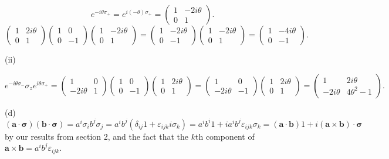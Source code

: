 \documentclass[11pt, letterpaper]{article}
\begin{document}
\[
	e^{-i\theta \sigma _+} =e^{i(-\theta )\sigma _+} =\begin{pmatrix}
	1 & -2i\theta  \\
	0 & 1
	\end{pmatrix}
.\]
\[
	\begin{pmatrix}
	1 & 2i\theta  \\
	0 & 1
	\end{pmatrix}\begin{pmatrix}
	1 & 0 \\
	0 & -1
	\end{pmatrix}\begin{pmatrix}
	1 & -2i\theta  \\
	0 & 1
	\end{pmatrix}=\begin{pmatrix}
	1 & -2i\theta  \\
	0 & -1
	\end{pmatrix}\begin{pmatrix}
	1 & -2i\theta  \\
	0 & 1
	\end{pmatrix}=\begin{pmatrix}
	1 & -4i\theta  \\
	0 & -1
	\end{pmatrix}
.\]

(ii)

\[
	e^{-i\theta \sigma _-} \sigma _ze^{i\theta \sigma _+} =\begin{pmatrix}
	1 & 0 \\
	-2i\theta  & 1
	\end{pmatrix}\begin{pmatrix}
	1 & 0 \\
	0 & -1
	\end{pmatrix}\begin{pmatrix}
	1 & 2i\theta  \\
	0 & 1
	\end{pmatrix}=\begin{pmatrix}
	1 & 0 \\
	-2i\theta  & -1
	\end{pmatrix}\begin{pmatrix}
	1 & 2i\theta  \\
	0 & 1
	\end{pmatrix}=\begin{pmatrix}
	1 & 2i\theta  \\
	-2i\theta & 4\theta ^2-1
	\end{pmatrix}
.\]


(d)
\[
	(\mathbf{a} \cdot \boldsymbol{\sigma} )(\mathbf{b} \cdot \boldsymbol{\sigma} )=a^i\sigma _ib^j\sigma _j=a^ib^j(\delta _{ij} 1+\varepsilon _{ijk} i\sigma _k)=a^ib^i1 + ia^ib^j\varepsilon _{ijk} \sigma _k = (\mathbf{a} \cdot \mathbf{b} )1+i(\mathbf{a} \times \mathbf{b} )\cdot \boldsymbol{\sigma} 
\]
by our results from section 2, and the fact that the $k$th component of $\mathbf{a} \times \mathbf{b} =a^ib^j\varepsilon _{ijk} $.
\end{document}
